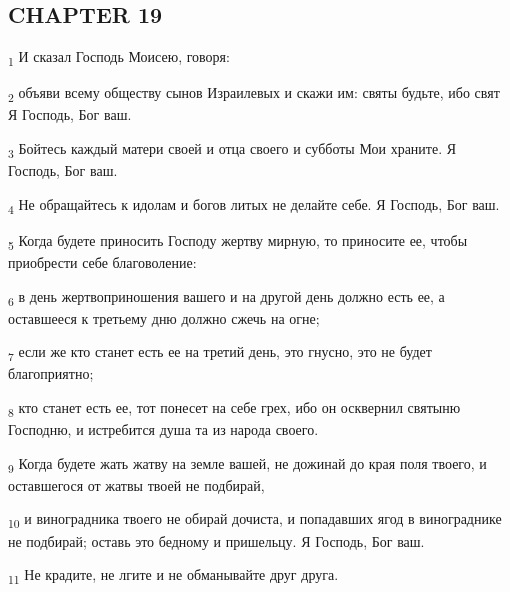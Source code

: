 \subsection{CHAPTER 19}
\begin{tcolorbox}
\textsubscript{1} И сказал Господь Моисею, говоря:
\end{tcolorbox}
\begin{tcolorbox}
\textsubscript{2} объяви всему обществу сынов Израилевых и скажи им: святы будьте, ибо свят Я Господь, Бог ваш.
\end{tcolorbox}
\begin{tcolorbox}
\textsubscript{3} Бойтесь каждый матери своей и отца своего и субботы Мои храните. Я Господь, Бог ваш.
\end{tcolorbox}
\begin{tcolorbox}
\textsubscript{4} Не обращайтесь к идолам и богов литых не делайте себе. Я Господь, Бог ваш.
\end{tcolorbox}
\begin{tcolorbox}
\textsubscript{5} Когда будете приносить Господу жертву мирную, то приносите ее, чтобы приобрести себе благоволение:
\end{tcolorbox}
\begin{tcolorbox}
\textsubscript{6} в день жертвоприношения вашего и на другой день должно есть ее, а оставшееся к третьему дню должно сжечь на огне;
\end{tcolorbox}
\begin{tcolorbox}
\textsubscript{7} если же кто станет есть ее на третий день, это гнусно, это не будет благоприятно;
\end{tcolorbox}
\begin{tcolorbox}
\textsubscript{8} кто станет есть ее, тот понесет на себе грех, ибо он осквернил святыню Господню, и истребится душа та из народа своего.
\end{tcolorbox}
\begin{tcolorbox}
\textsubscript{9} Когда будете жать жатву на земле вашей, не дожинай до края поля твоего, и оставшегося от жатвы твоей не подбирай,
\end{tcolorbox}
\begin{tcolorbox}
\textsubscript{10} и виноградника твоего не обирай дочиста, и попадавших ягод в винограднике не подбирай; оставь это бедному и пришельцу. Я Господь, Бог ваш.
\end{tcolorbox}
\begin{tcolorbox}
\textsubscript{11} Не крадите, не лгите и не обманывайте друг друга.
\end{tcolorbox}
